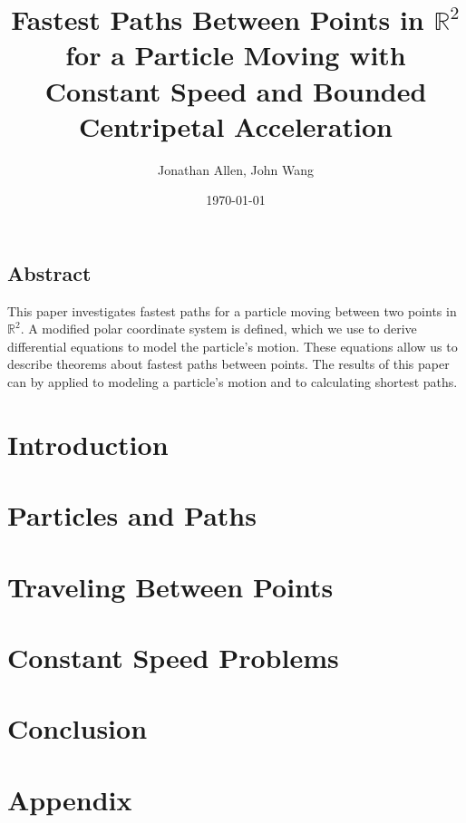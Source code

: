 \documentclass[12pt]{amsart}   %
\newcommand{\R}{\mathbb R}
\begin{document}
\graphicspath{ {figures/} }

\title[Fastest Paths in R2]{Fastest Paths Between Points in $\R^2$ for a Particle Moving with Constant Speed and Bounded Centripetal Acceleration} 
 
\author{Jonathan Allen, John Wang}
\date{\today}

\maketitle

\subsection*{Abstract}

This paper investigates fastest paths for a particle moving between two points in $\R^2$. A modified polar coordinate system is defined, which we use to derive differential equations to model the particle's motion. These equations allow us to describe theorems about fastest paths between points. The results of this paper can by applied to modeling a particle's motion and to calculating shortest paths. 

\section{Introduction}


\section{Particles and Paths}


\section{Traveling Between Points}


\section{Constant Speed Problems}


\section{Conclusion}


\section*{Appendix}



\end{document}
